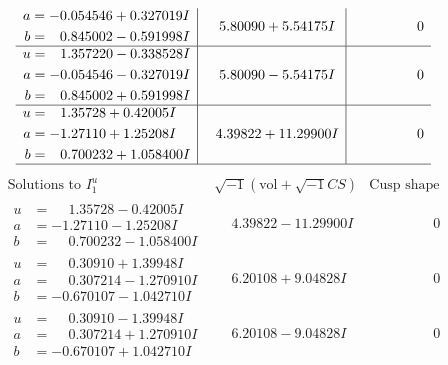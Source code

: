 \documentclass[1p]{elsarticle_modified}
\theoremstyle{definition}
\newcommand{\I}{\sqrt{-1}}
\begin{document}
$$\begin{array}{c|c|c}
\begin{aligned}
a &= -0.054546 + 0.327019 I \\
b &= \phantom{-}0.845002 - 0.591998 I\end{aligned}
 & \phantom{-}5.80090 + 5.54175 I & \phantom{-0.000000 } 0 \\ \hline\begin{aligned}
u &= \phantom{-}1.357220 - 0.338528 I \\
a &= -0.054546 - 0.327019 I \\
b &= \phantom{-}0.845002 + 0.591998 I\end{aligned}
 & \phantom{-}5.80090 - 5.54175 I & \phantom{-0.000000 } 0 \\ \hline\begin{aligned}
u &= \phantom{-}1.35728 + 0.42005 I \\
a &= -1.27110 + 1.25208 I \\
b &= \phantom{-}0.700232 + 1.058400 I\end{aligned}
 & \phantom{-}4.39822 + 11.29900 I & \phantom{-0.000000 } 0\\
 \hline 
 \end{array}$$\newpage$$\begin{array}{c|c|c}  
\text{Solutions to }I^u_{1}& \I (\text{vol} + \sqrt{-1}CS) & \text{Cusp shape}\\
 \hline 
\begin{aligned}
u &= \phantom{-}1.35728 - 0.42005 I \\
a &= -1.27110 - 1.25208 I \\
b &= \phantom{-}0.700232 - 1.058400 I\end{aligned}
 & \phantom{-}4.39822 - 11.29900 I & \phantom{-0.000000 } 0 \\ \hline\begin{aligned}
u &= \phantom{-}0.30910 + 1.39948 I \\
a &= \phantom{-}0.307214 - 1.270910 I \\
b &= -0.670107 - 1.042710 I\end{aligned}
 & \phantom{-}6.20108 + 9.04828 I & \phantom{-0.000000 } 0 \\ \hline\begin{aligned}
u &= \phantom{-}0.30910 - 1.39948 I \\
a &= \phantom{-}0.307214 + 1.270910 I \\
b &= -0.670107 + 1.042710 I\end{aligned}
 & \phantom{-}6.20108 - 9.04828 I & \phantom{-0.000000 } 0 \\ \hline\begin{aligned}

\end{aligned}
\end{array}$$
\end{document}

